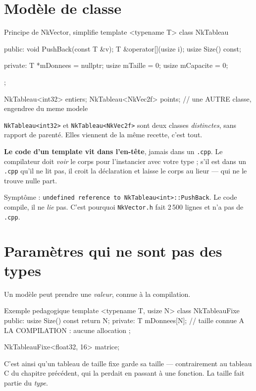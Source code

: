 \section{Modèle de classe}

\begin{nkcode}{Principe de NkVector, simplifie}
template <typename T>
class NkTableau {
    public:
        void PushBack(const T &v);
        T &operator[](usize i);
        usize Size() const;

    private:
        T *mDonnees = nullptr;
        usize mTaille = 0;
        usize mCapacite = 0;
};

NkTableau<int32>  entiers;
NkTableau<NkVec2f> points;   // une AUTRE classe, engendree du meme modele
\end{nkcode}

\texttt{NkTableau<int32>} et \texttt{NkTableau<NkVec2f>} sont deux classes
\emph{distinctes}, sans rapport de parenté. Elles viennent de la même recette,
c'est tout.

\begin{nkpiege}
\textbf{Le code d'un template vit dans l'en-tête}, jamais dans un \texttt{.cpp}.
Le compilateur doit \emph{voir} le corps pour l'instancier avec votre type ; s'il
est dans un \texttt{.cpp} qu'il ne lit pas, il croit la déclaration et laisse le
corps au lieur --- qui ne le trouve nulle part.

Symptôme : \texttt{undefined reference to NkTableau<int>::PushBack}. Le code
compile, il ne \emph{lie} pas. C'est pourquoi \texttt{NkVector.h} fait
2\,500 lignes et n'a pas de \texttt{.cpp}.
\end{nkpiege}

\section{Paramètres qui ne sont pas des types}

Un modèle peut prendre une \emph{valeur}, connue à la compilation.

\begin{nkcode}{Exemple pedagogique}
template <typename T, usize N>
class NkTableauFixe {
    public:
        usize Size() const { return N; }
    private:
        T mDonnees[N];        // taille connue A LA COMPILATION : aucune allocation
};

NkTableauFixe<float32, 16> matrice;
\end{nkcode}

\begin{nkretenir}
C'est ainsi qu'un tableau de taille fixe garde sa taille --- contrairement au
tableau C du chapitre précédent, qui la perdait en passant à une fonction. La
taille fait partie du \emph{type}.
\end{nkretenir}

